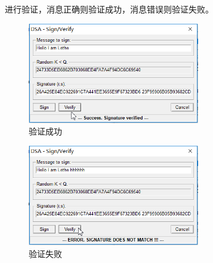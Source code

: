 \documentclass[UTF8,a4paper]{article}
\begin{document}
进行验证，消息正确则验证成功，消息错误则验证失败。\par 
\begin{figure}[!ht]
	
	\centering
	\includegraphics[width=0.67\textwidth]{pic3.PNG}
	\caption{验证成功}
	\label{fig:1-1}
\end{figure}


\begin{figure}[!ht]
	
	\centering
	\includegraphics[width=0.67\textwidth]{pic4.PNG}
	\caption{验证失败}
	\label{fig:1-1}
\end{figure}
\end{document}
